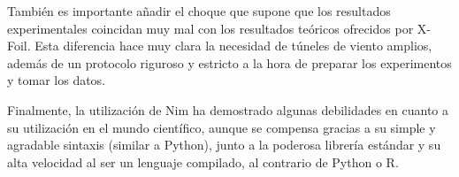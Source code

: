 \documentclass{article}
\begin{document}
También es importante añadir el choque que supone que los resultados experimentales coincidan muy mal con los resultados 
teóricos ofrecidos por X-Foil. Esta diferencia hace muy clara la necesidad de túneles de viento amplios, 
además de un protocolo riguroso y estricto a la hora de preparar los experimentos y tomar los datos.

Finalmente, la utilización de Nim ha demostrado algunas debilidades en cuanto a su utilización en el mundo científico,
aunque se compensa gracias a su simple y agradable sintaxis (similar a Python), junto a la poderosa librería estándar y su
alta velocidad al ser un lenguaje compilado, al contrario de Python o R.

\printbibliography
\end{document}

